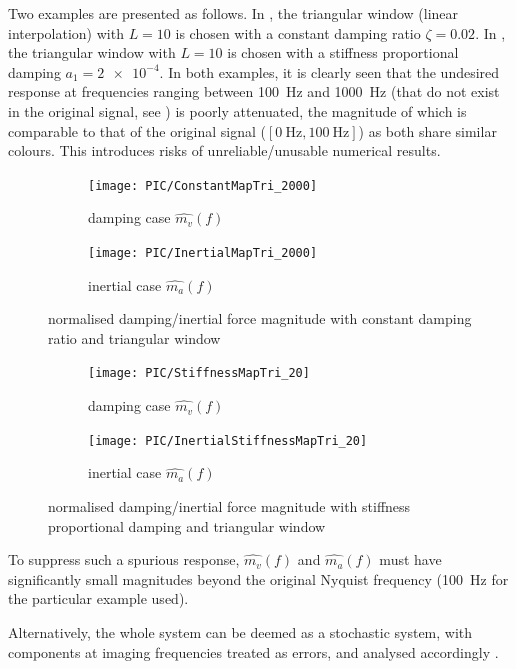 Two examples are presented as follows.
In , the triangular window (linear interpolation) with $L=10$ is chosen with a constant damping ratio $\zeta=\num{0.02}$. In , the triangular window with $L=10$ is chosen with a stiffness proportional damping $a_1=\num{2e-4}$. In both examples, it is clearly seen that the undesired response at frequencies ranging between \SI{100}{\hertz} and \SI{1000}{\hertz} (that do not exist in the original signal, see ) is poorly attenuated, the magnitude of which is comparable to that of the original signal ($[\SI{0}{\hertz},\SI{100}{\hertz}]$) as both share similar colours. This introduces risks of unreliable/unusable numerical results.
\begin{figure}[htb!]
\centering
\begin{subfigure}{.48\textwidth}
\texttt{[image: PIC/ConstantMapTri\_2000]}
\caption{damping case $\hat{m_v}\left(f\right)$}
\end{subfigure}
\begin{subfigure}{.48\textwidth}
\texttt{[image: PIC/InertialMapTri\_2000]}
\caption{inertial case $\hat{m_a}\left(f\right)$}
\end{subfigure}
\caption{normalised damping/inertial force magnitude with constant damping ratio and triangular window}\label{fig:map_constant}
\end{figure}
\begin{figure}[htb!]
\centering
\begin{subfigure}{.48\textwidth}
\texttt{[image: PIC/StiffnessMapTri\_20]}
\caption{damping case $\hat{m_v}\left(f\right)$}
\end{subfigure}
\begin{subfigure}{.48\textwidth}
\texttt{[image: PIC/InertialStiffnessMapTri\_20]}
\caption{inertial case $\hat{m_a}\left(f\right)$}
\end{subfigure}
\caption{normalised damping/inertial force magnitude with stiffness proportional damping and triangular window}\label{fig:map_stiffness}
\end{figure}

To suppress such a spurious response, $\hat{m_v}\left(f\right)$ and $\hat{m_a}\left(f\right)$ must have significantly small magnitudes beyond the original Nyquist frequency (\SI{100}{\hertz} for the particular example used).

Alternatively, the whole system can be deemed as a stochastic system, with components at imaging frequencies treated as errors, and analysed accordingly \citep[see, e.g.,][]{Soederstroem2002}.
